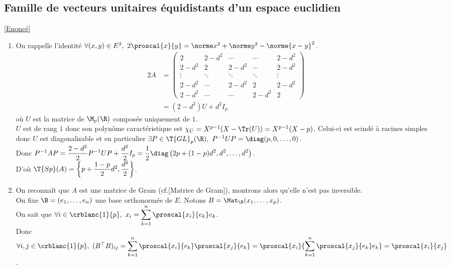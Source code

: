 \documentclass[8pt]{book}
\begin{document}
	\subsection{Famille de vecteurs unitaires équidistants d'un espace euclidien }
	\label{Famille de vecteurs unitaires équidistants d'un espace euclidien corrigé}
	\textcolor{blue}{\hyperref[Famille de vecteurs unitaires équidistants d'un espace euclidien]{[Enoncé]}}\\
	\begin{enumerate}[leftmargin=*]
		\item On rappelle l'identité $\forall (x,y)\in E^2,\ 2\proscal{x}{y}=\norme x^2+\norme y^2-\norme{x-y}^2$.\\
		\begin{align*}
			2A&=\begin{pmatrix}
				2&2-d^2&\cdots&\cdots&2-d^2\\
				2-d^2&2&2-d^2&\cdots&2-d^2\\
				\vdots&\ddots&\ddots&\ddots&\vdots\\
				2-d^2&\cdots&2-d^2&2&2-d^2\\
				2-d^2&\cdots&\cdots&2-d^2&2
			\end{pmatrix}\\
			&=(2-d^2)U+d^2I_p
		\end{align*}
		où $U$ est la matrice de $\M_p(\R)$ composée uniquement de $1$.\\
		$U$ est de rang $1$ donc son polynôme caractéristique est $\chi_U=X^{p-1}(X-\Tr(U))=X^{p-1}(X-p)$. Celui-ci est scindé à racines simples donc $U$ est diagonalisable et en particulier $\exists P\in \T{GL}_p(\R),\ P^{-1}UP=\diag(p,0,\dots,0)$.\\
		Donc $P^{-1}AP=\displaystyle\frac{2-d^2}{2}P^{-1}UP+\frac{d^2}{2}I_p=\frac{1}{2}\diag\left(2p+(1-p)d^2,d^2,\dots,d^2\right)$.\\
		D'où $\T{Sp}(A)=\left\{p+\dfrac{1-p}{2}d^2,\dfrac{d^2}{2}\right\}$.
		\item On reconnaît que $A$ est une matrice de Gram (cf.[Matrice de Gram]), montrons alors qu'elle n'est pas inversible.\\
		On fixe $\B=(e_1,\dots,e_n)$ une base orthonormée de $E$. Notons $B=\Mat_\B(x_1,\dots,x_p)$.\\
		On sait que $\forall i\in \crblanc{1}{p},\ x_i=\displaystyle\sum_{k=1}^n\proscal{x_i}{e_k}e_k$.\\
		Donc $\forall i,j\in \crblanc{1}{p},\ (B^\top B)_{ij}=\displaystyle\sum_{k=1}^n\proscal{x_i}{e_k}\proscal{x_j}{e_k}=\proscal{x_i}{\sum_{k=1}^n\proscal{x_j}{e_k}e_k}=\proscal{x_i}{x_j}$.\\

\end{enumerate}
\end{document}
